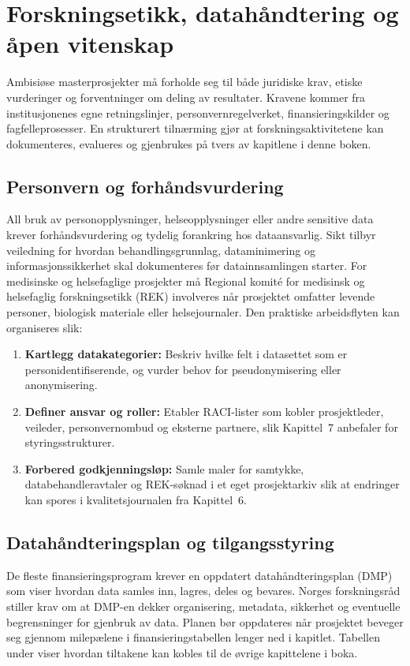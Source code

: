 \section{Forskningsetikk, datahåndtering og åpen vitenskap}
Ambisiøse masterprosjekter må forholde seg til både juridiske krav, etiske vurderinger og forventninger om deling av resultater. Kravene kommer fra institusjonenes egne retningslinjer, personvernregelverket, finansieringskilder og fagfelleprosesser. En strukturert tilnærming gjør at forskningsaktivitetene kan dokumenteres, evalueres og gjenbrukes på tvers av kapitlene i denne boken.

\subsection{Personvern og forhåndsvurdering}
All bruk av personopplysninger, helseopplysninger eller andre sensitive data krever forhåndsvurdering og tydelig forankring hos dataansvarlig. Sikt tilbyr veiledning for hvordan behandlingsgrunnlag, dataminimering og informasjonssikkerhet skal dokumenteres før datainnsamlingen starter.\citep{sikt2023personvern} For medisinske og helsefaglige prosjekter må Regional komité for medisinsk og helsefaglig forskningsetikk (REK) involveres når prosjektet omfatter levende personer, biologisk materiale eller helsejournaler.\citep{rek2024forhandsvurdering} Den praktiske arbeidsflyten kan organiseres slik:
\begin{enumerate}
    \item \textbf{Kartlegg datakategorier:} Beskriv hvilke felt i datasettet som er personidentifiserende, og vurder behov for pseudonymisering eller anonymisering.
    \item \textbf{Definer ansvar og roller:} Etabler RACI-lister som kobler prosjektleder, veileder, personvernombud og eksterne partnere, slik Kapittel~7 anbefaler for styringsstrukturer.
    \item \textbf{Forbered godkjenningsløp:} Samle maler for samtykke, databehandleravtaler og REK-søknad i et eget prosjektarkiv slik at endringer kan spores i kvalitetsjournalen fra Kapittel~6.
\end{enumerate}

\subsection{Datahåndteringsplan og tilgangsstyring}
De fleste finansieringsprogram krever en oppdatert datahåndteringsplan (DMP) som viser hvordan data samles inn, lagres, deles og bevares. Norges forskningsråd stiller krav om at DMP-en dekker organisering, metadata, sikkerhet og eventuelle begrensninger for gjenbruk av data.\citep{forskningsradet2023aapen} Planen bør oppdateres når prosjektet beveger seg gjennom milepælene i finansieringstabellen lenger ned i kapitlet. Tabellen under viser hvordan tiltakene kan kobles til de øvrige kapittelene i boka.

